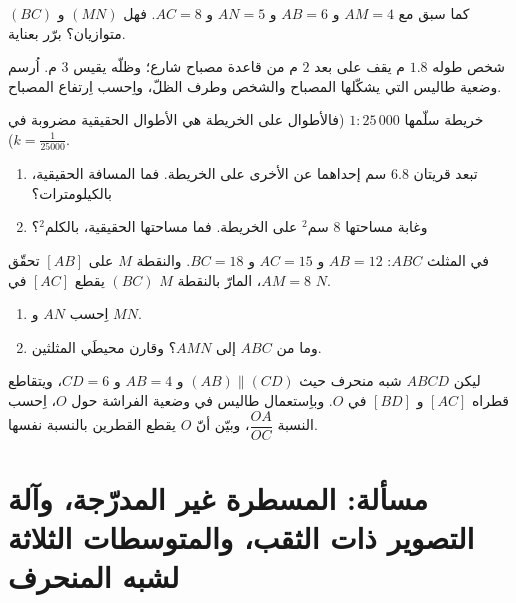 \begin{exercise}[$\star\star$]\label{exo:g9:thales:5}
كما سبق مع $AM = 4$ و $AB = 6$ و $AN = 5$ و $AC = 8$. فهل $(MN)$
و $(BC)$ متوازيان؟ برّر بعناية.
\end{exercise}

\begin{exercise}[$\star\star$]\label{exo:g9:thales:6}
شخص طوله $1.8$ م يقف على بعد $2$ م من قاعدة مصباح شارع؛ وظلّه
يقيس $3$ م. اُرسم وضعية طاليس التي يشكّلها المصباح والشخص وطرف
الظلّ، واِحسب اِرتفاع المصباح.
\end{exercise}

\begin{exercise}[$\star\star$]\label{exo:g9:thales:7}
خريطة سلّمها $1 : 25\,000$ (فالأطوال على الخريطة هي الأطوال
الحقيقية مضروبة في $k = \frac{1}{25000}$).
\begin{enumerate}
  \item تبعد قريتان $6.8$ سم إحداهما عن الأخرى على الخريطة. فما
        المسافة الحقيقية، بالكيلومترات؟
  \item وغابة مساحتها $8$ سم$^2$ على الخريطة. فما مساحتها
        الحقيقية، بالكلم$^2$؟
\end{enumerate}
\end{exercise}

\begin{exercise}[$\star\star$]\label{exo:g9:thales:8}
في المثلث $ABC$: $AB = 12$ و $AC = 15$ و $BC = 18$. والنقطة $M$
على $[AB]$ تحقّق $AM = 8$،  المارّ بالنقطة $M$
  $(BC)$ يقطع $[AC]$ في $N$.
\begin{enumerate}
  \item اِحسب $AN$ و $MN$.
  \item وما  من $ABC$ إلى $AMN$؟ وقارن
        محيطَي المثلثين.
\end{enumerate}
\end{exercise}

\begin{exercise}[$\star\star\star$]\label{exo:g9:thales:9}
ليكن $ABCD$ شبه منحرف حيث $(AB) \parallel (CD)$ و $AB = 4$
و $CD = 6$، ويتقاطع قطراه $[AC]$ و $[BD]$ في $O$.
وباِستعمال طاليس في وضعية الفراشة حول $O$، اِحسب النسبة
$\dfrac{OA}{OC}$، وبيّن أنّ $O$ يقطع القطرين بالنسبة نفسها.
\end{exercise}

\section{مسألة: المسطرة غير المدرّجة، وآلة التصوير ذات الثقب،
والمتوسطات الثلاثة لشبه المنحرف}

